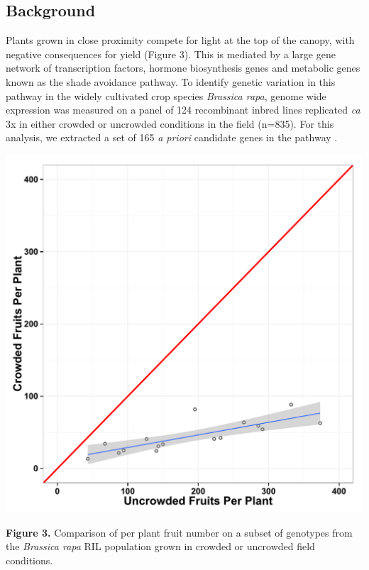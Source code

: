 \documentclass[landscape,paperwidth=48in,paperheight=36in,fontscale=0.35]{baposter}
\begin{document}
\begin{poster}
{\begin{multicols}{2}
\subsection*{Background} 
Plants grown in close proximity compete for light at the top of the canopy, with negative consequences for yield (Figure 3). This is mediated by a large gene network of transcription factors, hormone biosynthesis genes and metabolic genes known as the shade avoidance pathway. To identify genetic variation in this pathway in the widely cultivated crop species \emph{Brassica rapa}, genome wide expression was measured on a panel of 124 recombinant inbred lines replicated \emph{ca} 3x in either crowded or uncrowded conditions in the field (n=835). For this analysis, we extracted a set of 165 \emph{a priori} candidate genes in the pathway \citep{Nozue:2015dt}.
\begin{center}
\includegraphics[width=1\columnwidth]{UN_CR_Fruit_regression.pdf} 
\end{center}
\textbf{Figure 3.} Comparison of per plant fruit number on a subset of genotypes from the \emph{Brassica rapa} RIL population grown in crowded or uncrowded field conditions.
\end{multicols}

}
\end{poster}
\end{document}
